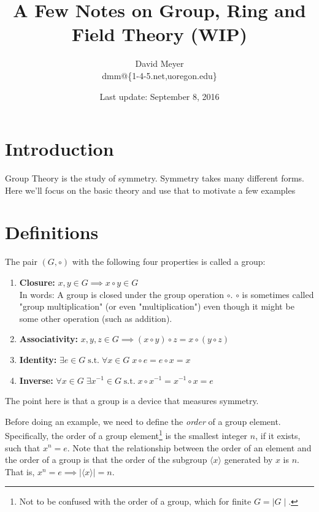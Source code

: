 \documentclass[11pt, oneside]{article}   	%
\title{A Few Notes on Group, Ring and Field Theory (WIP)}
\author{David Meyer \\ dmm@\{1-4-5.net,uoregon.edu\}}
\date{Last update: September 8, 2016}							%
\theoremstyle{definition}
\begin{document}
\maketitle

\section{Introduction}
Group Theory is the study of symmetry. Symmetry takes many different forms. Here we'll focus on the basic theory and use that to motivate a 
few examples

\section{Definitions}
The pair $(G,\circ)$ with the following four properties is called a group:

\begin{enumerate}
\item \textbf{Closure:} $x, y \in G \implies x \circ y \in G$  \\
In words: A group is closed under the group operation $\circ$. $\circ$ is sometimes called "group multiplication" (or even "multiplication") even 
though it might be some other operation (such as addition).

\item \textbf{Associativity:} $x,y,z \in G \implies  (x \circ y) \circ z = x \circ (y \circ z)$

\item \textbf{Identity:} $\exists e \in G \;  \text{s.t.} \;  \forall x \in G \; x \circ e = e \circ x = x$

\item \textbf{Inverse:} $\forall x \in G \;  \exists x^{-1} \in G  \;  \text{s.t.} \;  x \circ x^{-1} = x^{-1} \circ x = e$
\end{enumerate}

\bigskip
\noindent
The point here is that a group is a device that measures symmetry. 

\bigskip
\noindent
Before doing an example, we need to define the \emph{order} of a group
element. Specifically, the order of a group element\footnote{Not to be confused with the order of a group, which for finite $G = \mid G \mid$.}
is the smallest integer $n$, if it exists, such that  $x^n = e$. Note that the relationship between the order of an element and the order of a 
group is that the order of the subgroup $\langle x \rangle$ generated by $x$ is $n$. That is, $x^n = e \implies | \langle x \rangle | = n$.
\end{document}
